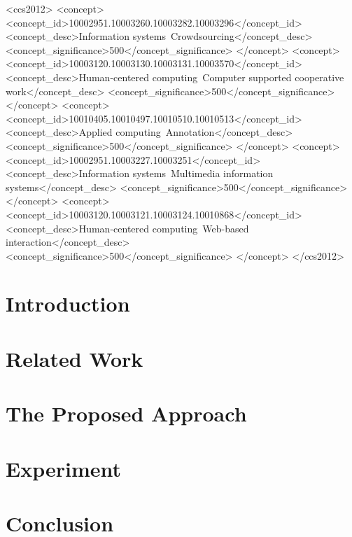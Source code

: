 \documentclass[sigconf]{acmart}
\begin{document}
%
%
\begin{CCSXML}
<ccs2012>
<concept>
<concept_id>10002951.10003260.10003282.10003296</concept_id>
<concept_desc>Information systems~Crowdsourcing</concept_desc>
<concept_significance>500</concept_significance>
</concept>
<concept>
<concept_id>10003120.10003130.10003131.10003570</concept_id>
<concept_desc>Human-centered computing~Computer supported cooperative work</concept_desc>
<concept_significance>500</concept_significance>
</concept>
<concept>
<concept_id>10010405.10010497.10010510.10010513</concept_id>
<concept_desc>Applied computing~Annotation</concept_desc>
<concept_significance>500</concept_significance>
</concept>
<concept>
<concept_id>10002951.10003227.10003251</concept_id>
<concept_desc>Information systems~Multimedia information systems</concept_desc>
<concept_significance>500</concept_significance>
</concept>
<concept>
<concept_id>10003120.10003121.10003124.10010868</concept_id>
<concept_desc>Human-centered computing~Web-based interaction</concept_desc>
<concept_significance>500</concept_significance>
</concept>
</ccs2012>
\end{CCSXML}





\maketitle

\section{Introduction}
	

\section{Related Work}
	
	
\section{The Proposed Approach}
	

\section{Experiment}
	

\section{Conclusion}
	

\begin{acks}
	
\end{acks}




 
\end{document}
